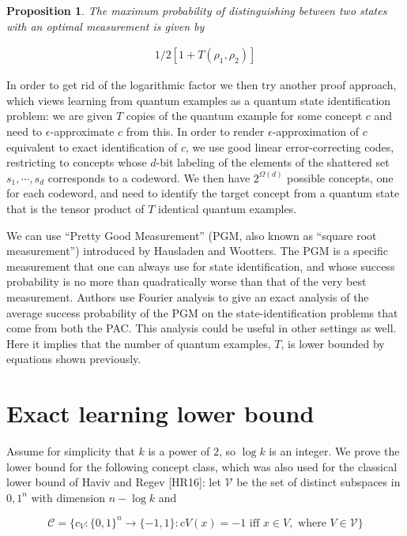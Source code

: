 \documentclass[12]{amsart}
\newcommand\0{\mathbf{0}}
\newcommand\<{\langle}
\renewcommand\>{\rangle}
\newtheorem{proposition}[theorem]{Proposition}
\begin{document}
\begin{proposition}
The maximum probability of distinguishing between two states with an optimal measurement is given by

\begin{align*}
	1/2[1 + T(\rho_1, \rho_2)]
\end{align*}
\end{proposition}

In order to get rid of the logarithmic factor we then try another proof approach, which views learning from quantum examples as a quantum state identification problem: we are given $T$ copies of the quantum example for some concept $c$ and need to $\epsilon$-approximate $c$ from this. In order to render $\epsilon$-approximation of $c$ equivalent to exact identification of $c$, we use good linear error-correcting codes, restricting to concepts whose $d$-bit labeling of the elements of the shattered set $s_1,\cdots ,s_d$ corresponds to a codeword. We then have $2^{\Omega(d)}$ possible concepts, one for each codeword, and need to identify the target concept from a quantum state that is the tensor product of $T$ identical quantum examples.

We can use “Pretty Good Measurement” (PGM, also known as “square root measurement”) introduced by Hausladen and Wootters. The PGM is a specific measurement that one can always use for state identification, and whose success probability is no more than quadratically worse than that of the very best measurement. Authors use Fourier analysis to give an exact analysis of the average success probability of the PGM on the state-identification problems that come from both the PAC. This analysis could be useful in other settings as well. Here it implies that the number of quantum examples, $T$, is lower bounded by equations shown previously.

\section{Exact learning lower bound}

Assume for simplicity that $k$ is a power of $2$, so $\log k$ is an integer. We prove the lower bound for the following concept class, which was also used for the classical lower bound of Haviv and Regev [HR16]: let $\mathcal{V}$ be the set of distinct subspaces in ${0, 1}^n$ with dimension $n − \log k$ and

$$
\mathcal{C}=\{c_V :\{0,1\}^n →\{−1,1\}: cV(x)=-1\text{ iff }x \in V,\text{ where }V \in \mathcal{V} \}
$$
\end{document}
